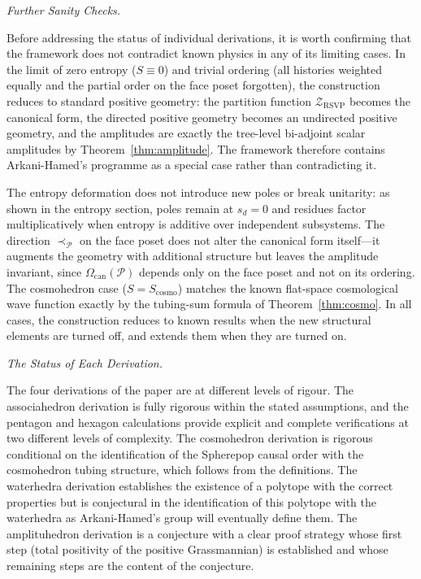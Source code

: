 \documentclass[11pt]{article}
\theoremstyle{plain}
\theoremstyle{definition}
\theoremstyle{remark}
\newcommand{\Sf}{S}
\newcommand{\CF}{\Omega_{\mathrm{can}}}
\newcommand{\ZRSVP}{\mathcal{Z}_{\mathrm{RSVP}}}
\begin{document}
\medskip\noindent\textit{Further Sanity Checks.}

Before addressing the status of individual derivations, it is worth confirming that the framework does not contradict known physics in any of its limiting cases. In the limit of zero entropy ($\Sf \equiv 0$) and trivial ordering (all histories weighted equally and the partial order on the face poset forgotten), the construction reduces to standard positive geometry: the partition function $\ZRSVP$ becomes the canonical form, the directed positive geometry becomes an undirected positive geometry, and the amplitudes are exactly the tree-level bi-adjoint scalar amplitudes by Theorem~\ref{thm:amplitude}. The framework therefore contains Arkani-Hamed's programme as a special case rather than contradicting it.

The entropy deformation does not introduce new poles or break unitarity: as shown in the entropy section, poles remain at $s_d = 0$ and residues factor multiplicatively when entropy is additive over independent subsystems. The direction $\prec_{\mathcal{P}}$ on the face poset does not alter the canonical form itself---it augments the geometry with additional structure but leaves the amplitude invariant, since $\CF(\mathcal{P})$ depends only on the face poset and not on its ordering. The cosmohedron case ($\Sf = \Sf_{\mathrm{cosmo}}$) matches the known flat-space cosmological wave function exactly by the tubing-sum formula of Theorem~\ref{thm:cosmo}. In all cases, the construction reduces to known results when the new structural elements are turned off, and extends them when they are turned on.

\medskip\noindent\textit{The Status of Each Derivation.}

The four derivations of the paper are at different levels of rigour. The associahedron derivation is fully rigorous within the stated assumptions, and the pentagon and hexagon calculations provide explicit and complete verifications at two different levels of complexity. The cosmohedron derivation is rigorous conditional on the identification of the Spherepop causal order with the cosmohedron tubing structure, which follows from the definitions. The waterhedra derivation establishes the existence of a polytope with the correct properties but is conjectural in the identification of this polytope with the waterhedra as Arkani-Hamed's group will eventually define them. The amplituhedron derivation is a conjecture with a clear proof strategy whose first step (total positivity of the positive Grassmannian) is established and whose remaining steps are the content of the conjecture.
\end{document}
